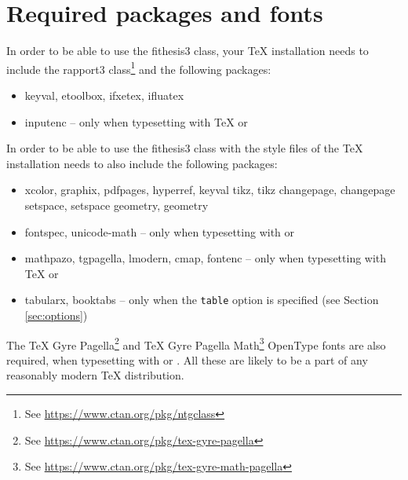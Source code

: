 \documentclass[color,table,cover,twoside,lot,lof]{../../fithesis3}
\begin{document}
  \section{Required packages and fonts}\label{sec:req-packages}
  In order to be able to use the \textsf{fithesis3} class, your
  \TeX{} installation needs to include the \textsf{rapport3}
  class\footnote{See
  \url{https://www.ctan.org/pkg/ntgclass}} and the following
  packages:\begin{itemize}
    \item\textsf{keyval}, \textsf{etoolbox}, \textsf{ifxetex},
      \textsf{ifluatex}
    \item\textsf{inputenc} -- only when typesetting with \TeX{} or
  \end{itemize} In order to be able to use the \textsf{fithesis3}
  class with the style files of the
  \makeatletter\thesis@english@facultyName%
  \TeX{} installation needs to also include the following
  packages:\begin{itemize}
    \item\textsf{xcolor}, \textsf{graphix}, \textsf{pdfpages},
      \textsf{hyperref}, \textsf{keyval}%
      {\makeatletter %
      \def\thguide@prnpkg#1{\ltx@ifpackageloaded%
        {#1}{, \textsf{#1}}{}}%
      \thguide@prnpkg{tikz}%
      \thguide@prnpkg{changepage}%
      \thguide@prnpkg{setspace}%
      \thguide@prnpkg{geometry}}
    \item\textsf{fontspec}, \textsf{unicode-math} -- only when
      typesetting with  or 
    \item\textsf{mathpazo}, \textsf{tgpagella}, \textsf{lmodern},
       \textsf{cmap}, \textsf{fontenc} -- only when typesetting
       with \TeX{} or 
    \item\textsf{tabularx}, \textsf{booktabs} -- only when the
      \texttt{table} option is specified (see Section
      \ref{sec:options})
  \end{itemize}
  The \TeX{} Gyre Pagella\footnote{See
  \url{https://www.ctan.org/pkg/tex-gyre-pagella}} and
  \TeX{} Gyre Pagella Math\footnote{See
  \url{https://www.ctan.org/pkg/tex-gyre-math-pagella}} OpenType
  fonts are also required, when typesetting with  or
  . All these are likely to be a part of any
  reasonably modern \TeX{} distribution.
\end{document}
